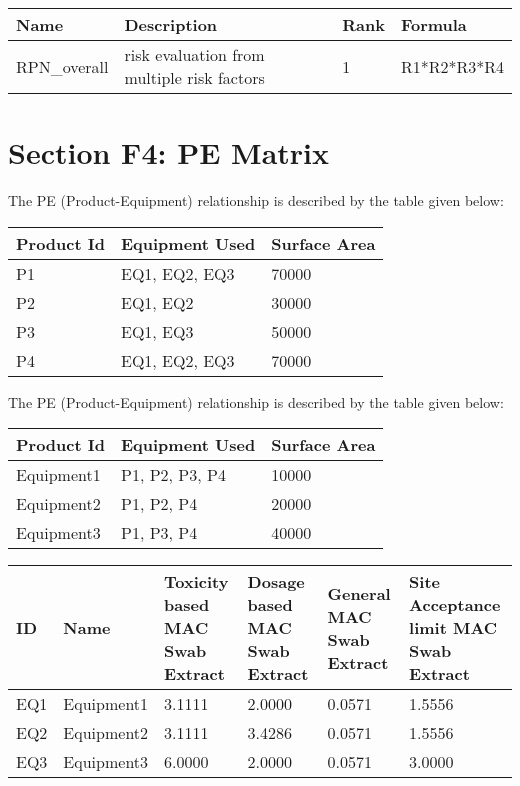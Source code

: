 \documentclass{article}
\begin{document}
        \begin{longtable}[l]{|p{2cm}|p{3cm}|p{1.5cm}|p{3cm}|}

\hline
Name & Description & Rank & Formula\\
\hline

RPN\_overall & risk evaluation from multiple risk factors & 1 & R1*R2*R3*R4\\
\hline

    \end{longtable}
    
        
        \newpage
        \section{Section F4: PE Matrix}
        The PE (Product-Equipment) relationship is described by the table given below:
        \begin{longtable}[l]{ |p{3cm} |p{5cm} |p{3cm}|}
        \hline

        Product Id & Equipment Used & Surface Area\\

        \hline

    P1 & EQ1, EQ2, EQ3 & 70000\\
\hline
P2 & EQ1, EQ2 & 30000\\
\hline
P3 & EQ1, EQ3 & 50000\\
\hline
P4 & EQ1, EQ2, EQ3 & 70000\\
\hline

    \end{longtable}
    The PE (Product-Equipment) relationship is described by the table given below:
    \begin{longtable}[l]{ |p{3cm} |p{5cm} |p{3cm}|}
    \hline

    Product Id & Equipment Used & Surface Area\\

    \hline

    Equipment1 & P1, P2, P3, P4 & 10000\\
\hline
Equipment2 & P1, P2, P4 & 20000\\
\hline
Equipment3 & P1, P3, P4 & 40000\\
\hline

    \end{longtable}
    
        \begin{longtable}[l]{|p{1.5cm}|p{2cm}|p{3cm}|p{3cm}|p{3cm}|p{3cm}|}

\hline
ID & Name & Toxicity based MAC Swab Extract & Dosage based MAC Swab Extract & General MAC Swab Extract  & Site Acceptance limit MAC Swab Extract\\
\hline

EQ1 & Equipment1 & 3.1111 & 2.0000 & 0.0571 & 1.5556\\
\hline
EQ2 & Equipment2 & 3.1111 & 3.4286 & 0.0571 & 1.5556\\
\hline
EQ3 & Equipment3 & 6.0000 & 2.0000 & 0.0571 & 3.0000\\
\hline

    \end{longtable}
    
\end{document}
